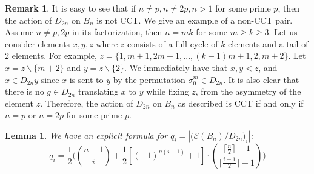 \documentclass[10 pt]{amsart}
\theoremstyle{plain}
\newtheorem{lem}[thm]{Lemma}
\theoremstyle{definition}
\newtheorem{rem}[thm]{Remark}
\theoremstyle{remark}
\numberwithin{equation}{section}
\newcommand{\minus}{\backslash}
\begin{document}
\begin{rem}
\label{prop:iff_dihedral_cct}
It is easy to see that if $n \neq p,n \neq 2p, n >1$ for some prime $p$, then the action of $D_{2n}$ on $B_n$ is not CCT. We give an example of a non-CCT pair. Assume $n \ne p, 2 p$ in its factorization, then $n = mk$ for some $m \ge k \ge 3$. Let us consider elements $x, y, z$ where $z$ consists of a full cycle of $k$ elements and a tail of $2$ elements. For example, $z = \{1, m+1, 2m+1, ..., (k-1)m
+1, 2, m+2\}$. Let $x = z \minus \{m+2\}$ and $y = z \minus \{2\}$. We immediately have that $x, y \lessdot z$, and $x \in D_{2n} y$ since $x$ is sent to $y$ by the permutation $\sigma_0^m \in D_{2n}$. It is also clear that there is no $g \in D_{2n}$ translating $x$ to $y$ while fixing $z$, from the asymmetry of the element $z$. Therefore, the action of $D_{2n}$ on $B_n$ as described is CCT if and only if $n =p$ or $n = 2p$ for some prime $p$. 
\end{rem}


\begin{lem}{\label{dihedral002}}
 We have an explicit formula for $q_i = |\big(\mathcal E (B_n)/D_{2n} \big)_i|$:
 $$q_i = \frac{1}{2} \Big( {n-1 \choose i } + \frac{1}{2} [(-1)^{n(i+1)}+1] \cdot { \lceil \frac n 2\rceil -1  \choose \lceil \frac{i+1} 2 \rceil - 1}  \Big)$$
\end{lem}
\end{document}
